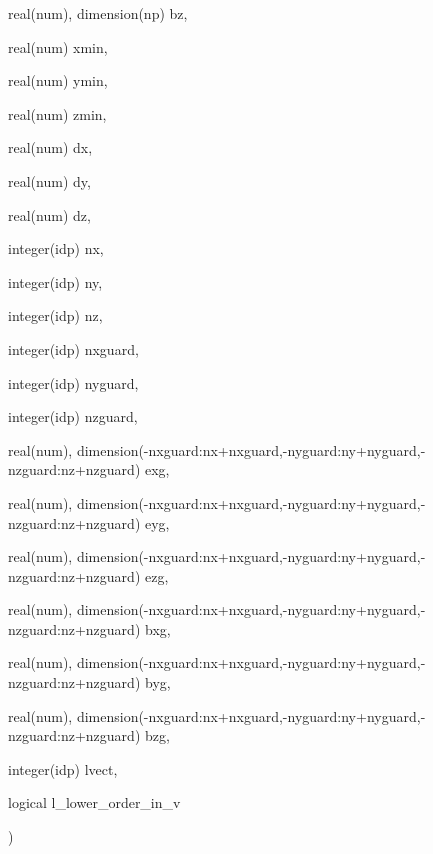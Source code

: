{\begin{DoxyParamCaption}
\item[{real(num), dimension(np)}]{bz, }
\item[{real(num)}]{xmin, }
\item[{real(num)}]{ymin, }
\item[{real(num)}]{zmin, }
\item[{real(num)}]{dx, }
\item[{real(num)}]{dy, }
\item[{real(num)}]{dz, }
\item[{integer(idp)}]{nx, }
\item[{integer(idp)}]{ny, }
\item[{integer(idp)}]{nz, }
\item[{integer(idp)}]{nxguard, }
\item[{integer(idp)}]{nyguard, }
\item[{integer(idp)}]{nzguard, }
\item[{real(num), dimension(-\/nxguard\+:nx+nxguard,-\/nyguard\+:ny+nyguard,-\/nzguard\+:nz+nzguard)}]{exg, }
\item[{real(num), dimension(-\/nxguard\+:nx+nxguard,-\/nyguard\+:ny+nyguard,-\/nzguard\+:nz+nzguard)}]{eyg, }
\item[{real(num), dimension(-\/nxguard\+:nx+nxguard,-\/nyguard\+:ny+nyguard,-\/nzguard\+:nz+nzguard)}]{ezg, }
\item[{real(num), dimension(-\/nxguard\+:nx+nxguard,-\/nyguard\+:ny+nyguard,-\/nzguard\+:nz+nzguard)}]{bxg, }
\item[{real(num), dimension(-\/nxguard\+:nx+nxguard,-\/nyguard\+:ny+nyguard,-\/nzguard\+:nz+nzguard)}]{byg, }
\item[{real(num), dimension(-\/nxguard\+:nx+nxguard,-\/nyguard\+:ny+nyguard,-\/nzguard\+:nz+nzguard)}]{bzg, }
\item[{integer(idp)}]{lvect, }
\item[{logical}]{l\+\_\+lower\+\_\+order\+\_\+in\+\_\+v}
\end{DoxyParamCaption}
)}\hypertarget{field__gathering__3d__o3_8_f90_a6e3a3b1519fdd7090c55244b49a8d80f}{}\label{field__gathering__3d__o3_8_f90_a6e3a3b1519fdd7090c55244b49a8d80f}
